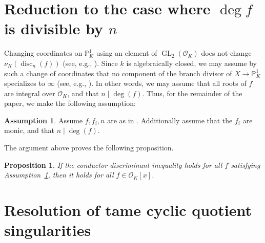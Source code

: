 \documentclass[12pt]{amsart}
\numberwithin{equation}{section}
\newtheorem{prop}[equation]{Proposition}
\theoremstyle{definition}
\newtheorem{assumption}[equation]{Assumption}
\newcommand{\andrew}[1]{{\color{Green} \sf $\diamondsuit\diamondsuit\diamondsuit$ Andrew: [#1]}}
\newcommand{\mc}[1]{\mathcal{#1}}
\renewcommand{\P}{\mathbb P}
\newcommand{\proj}{\mathbb P}
\DeclareMathOperator{\GL}{GL}
\DeclareMathOperator{\disc}{disc}
\begin{document}
\section{Reduction to the case where $\deg f$ is divisible by $n$}\label{Sfurtherredn}
Changing coordinates on
$\P^1_K$ using an element of $\GL_2(\mc{O}_K)$ does not change
$\nu_K(\disc_n(f))$ (see, e.g., \cite[Ch.\ 12, (1.26)]{GKZ}).
Since $k$ is
algebraically closed, we may assume by
such a change of coordinates that no component of the branch divisor of $X \rightarrow \proj^1_K$ specializes to $\infty$ (see, e.g., \cite[Section~1.3]{PadmaRational}). In other words, we may assume that all roots of $f$ are integral over $\mc{O}_K$,
and that $n \mid \deg(f)$.   
Thus, for the remainder of the paper, we make the following assumption:

\begin{assumption}\label{Afform} Assume $f,f_i,n$ are as in . Additionally assume that the $f_i$ are monic, and that $n \mid \deg(f)$.
\end{assumption}
 
 
 
The argument above proves the following proposition.
\begin{prop}\label{Preduce2}
If the conductor-discriminant inequality holds for all $f$ satisfying Assumption~\ref{Afform}, then it holds for all $f \in \mc{O}_K[x]$.
\end{prop}

\section{Resolution of tame cyclic quotient singularities}\label{Stame}
\end{document}
